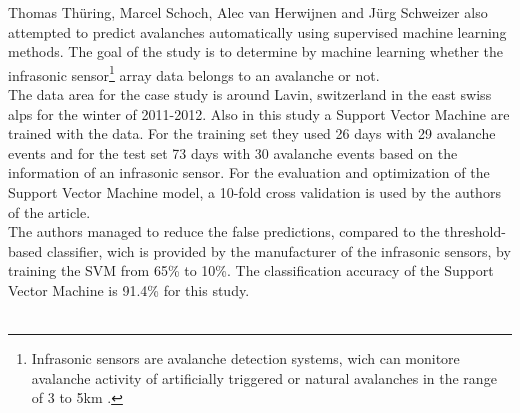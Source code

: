 \documentclass[../masterarbeit.tex]{subfiles}
\begin{document}
Thomas Thüring, Marcel Schoch, Alec van Herwijnen and Jürg Schweizer \textcite[]{THURING201560} also attempted to predict avalanches automatically using supervised machine learning methods. The goal of the study is to determine by machine learning whether the infrasonic sensor\footnote{Infrasonic sensors are avalanche detection systems, wich can monitore avalanche activity of artificially triggered or natural avalanches in the range of 3 to 5km \textcite[]{wyssenavalanche:2022}. } array data belongs to an avalanche or not. \autocite[]{THURING201560} \\
The data area for the case study is around Lavin, switzerland in the east swiss alps for the winter of 2011-2012. Also in this study a Support Vector Machine are trained with the data. For the training set they used 26 days with 29 avalanche events and for the test set 73 days with 30 avalanche events based on the information of an infrasonic sensor. For the evaluation and optimization of the Support Vector Machine model, a 10-fold cross validation is used by the authors of the article. \autocite[]{THURING201560} \\
The authors managed to reduce the false predictions, compared to the threshold-based classifier, wich is provided by the manufacturer of the infrasonic sensors, by training the SVM from 65\% to 10\%. The classification accuracy of the Support Vector Machine is 91.4\% for this study.  \autocite[]{THURING201560} \\~\\
\end{document}
